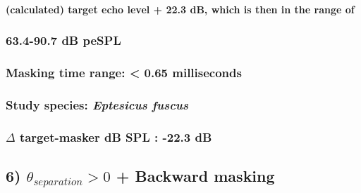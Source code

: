 \documentclass[11pt]{article}
\begin{document}
\hypertarget{calculated-target-echo-level-22.3-db-which-is-then-in-the-range-of}{%
\paragraph{(calculated) target echo level + 22.3 dB, which is then in
the range
of}\label{calculated-target-echo-level-22.3-db-which-is-then-in-the-range-of}}

\hypertarget{db-pespl-1}{%
\subsubsection{63.4-90.7 dB peSPL}\label{db-pespl-1}}

\hypertarget{masking-time-range-0.65-milliseconds}{%
\subsubsection{Masking time range: \textless{} 0.65
milliseconds}\label{masking-time-range-0.65-milliseconds}}

\hypertarget{study-species-eptesicus-fuscus-1}{%
\subsubsection{\texorpdfstring{Study species: \emph{Eptesicus
fuscus}}{Study species: Eptesicus fuscus}}\label{study-species-eptesicus-fuscus-1}}

\hypertarget{delta-target-masker-db-spl--22.3-db}{%
\subsubsection{\texorpdfstring{\(\Delta\) target-masker dB SPL : -22.3
dB}{\textbackslash{}Delta target-masker dB SPL : -22.3 dB}}\label{delta-target-masker-db-spl--22.3-db}}

    \hypertarget{theta_separation-0-backward-masking}{%
\subsection{\texorpdfstring{6) \(\theta_{separation} >0\) + Backward
masking}{6) \textbackslash{}theta\_\{separation\} \textgreater{}0 + Backward masking}}\label{theta_separation-0-backward-masking}}
\end{document}
